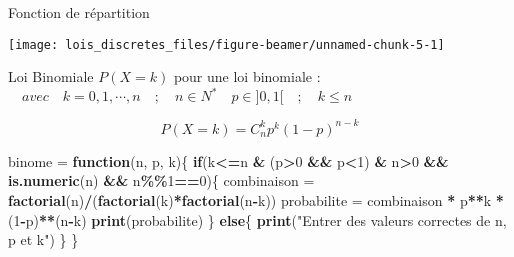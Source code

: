 \documentclass[
  ignorenonframetext,
]{beamer}
\newenvironment{Shaded}{\begin{snugshade}}{\end{snugshade}}
\newcommand{\ControlFlowTok}[1]{\textcolor[rgb]{0.13,0.29,0.53}{\textbf{#1}}}
\newcommand{\DecValTok}[1]{\textcolor[rgb]{0.00,0.00,0.81}{#1}}
\newcommand{\FunctionTok}[1]{\textcolor[rgb]{0.13,0.29,0.53}{\textbf{#1}}}
\newcommand{\NormalTok}[1]{#1}
\newcommand{\OtherTok}[1]{\textcolor[rgb]{0.56,0.35,0.01}{#1}}
\newcommand{\SpecialCharTok}[1]{\textcolor[rgb]{0.81,0.36,0.00}{\textbf{#1}}}
\newcommand{\StringTok}[1]{\textcolor[rgb]{0.31,0.60,0.02}{#1}}
\begin{document}
\begin{frame}{Fonction de répartition}
\protect\hypertarget{fonction-de-ruxe9partition-1}{}
\begin{center}\texttt{[image: lois\_discretes\_files/figure-beamer/unnamed-chunk-5-1]} \end{center}
\end{frame}

\begin{frame}[fragile]{Loi Binomiale}
\protect\hypertarget{loi-binomiale}{}
\(P(X=k)\) pour une loi binomiale :
\(\quad avec \quad k=0,1, \cdots, n \quad ; \quad n \in N^* \quad p \in ]0,1[ \quad ; \quad k\le n\)

\[P(X=k) = C_n^k p^k (1-p)^{n-k}\]

\begin{Shaded}
\begin{Highlighting}[]
\NormalTok{binome }\OtherTok{=} \ControlFlowTok{function}\NormalTok{(n, p, k)\{}
  \ControlFlowTok{if}\NormalTok{(k}\SpecialCharTok{\textless{}=}\NormalTok{n }\SpecialCharTok{\&}\NormalTok{ (p}\SpecialCharTok{\textgreater{}}\DecValTok{0} \SpecialCharTok{\&\&}\NormalTok{ p}\SpecialCharTok{\textless{}}\DecValTok{1}\NormalTok{) }\SpecialCharTok{\&}\NormalTok{ n}\SpecialCharTok{\textgreater{}}\DecValTok{0} \SpecialCharTok{\&\&} \FunctionTok{is.numeric}\NormalTok{(n) }\SpecialCharTok{\&\&}\NormalTok{ n}\SpecialCharTok{\%\%}\DecValTok{1}\SpecialCharTok{==}\DecValTok{0}\NormalTok{)\{}
\NormalTok{    combinaison }\OtherTok{=} \FunctionTok{factorial}\NormalTok{(n)}\SpecialCharTok{/}\NormalTok{(}\FunctionTok{factorial}\NormalTok{(k)}\SpecialCharTok{*}\FunctionTok{factorial}\NormalTok{(n}\SpecialCharTok{{-}}\NormalTok{k))}
\NormalTok{    probabilite  }\OtherTok{=}\NormalTok{ combinaison }\SpecialCharTok{*}\NormalTok{ p}\SpecialCharTok{**}\NormalTok{k }\SpecialCharTok{*}\NormalTok{ (}\DecValTok{1}\SpecialCharTok{{-}}\NormalTok{p)}\SpecialCharTok{**}\NormalTok{(n}\SpecialCharTok{{-}}\NormalTok{k)}
    \FunctionTok{print}\NormalTok{(probabilite)}
\NormalTok{  \} }\ControlFlowTok{else}\NormalTok{\{}
    \FunctionTok{print}\NormalTok{(}\StringTok{"Entrer des valeurs correctes de n, p et k"}\NormalTok{)}
\NormalTok{  \}}
\NormalTok{\}}
\end{Highlighting}
\end{Shaded}
\end{frame}
\end{document}
